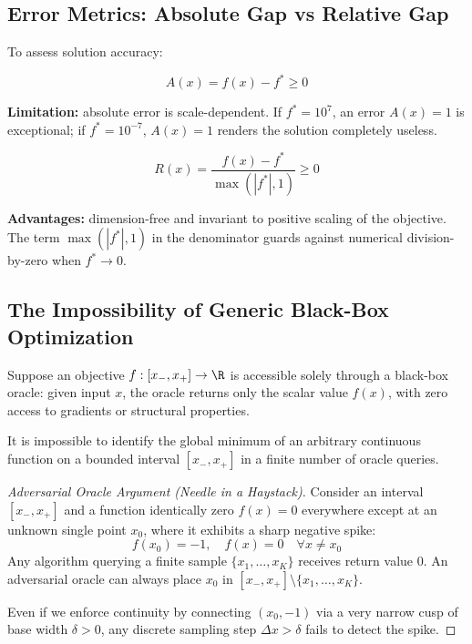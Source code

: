 \subsection{Error Metrics: Absolute Gap vs Relative Gap}
To assess solution accuracy:
\begin{definition}
\begin{equation}
A(x) = f(x) - f^* \ge 0
\end{equation}
\end{definition}
\textbf{Limitation:} absolute error is scale-dependent. If $f^* = 10^7$, an error $A(x) = 1$ is exceptional; if $f^* = 10^{-7}$, $A(x) = 1$ renders the solution completely useless.

\begin{definition}
\begin{equation}
R(x) = \frac{f(x) - f^*}{\max(|f^*|, 1)} \ge 0
\end{equation}
\end{definition}
\textbf{Advantages:} dimension-free and invariant to positive scaling of the objective. The term $\max(|f^*|, 1)$ in the denominator guards against numerical division-by-zero when $f^* \to 0$.

\subsection{The Impossibility of Generic Black-Box Optimization}
Suppose an objective $f: [x_-, x_+] \to \R$ is accessible solely through a black-box oracle: given input $x$, the oracle returns only the scalar value $f(x)$, with zero access to gradients or structural properties.

\begin{theorem}
It is impossible to identify the global minimum of an arbitrary continuous function on a bounded interval $[x_-, x_+]$ in a finite number of oracle queries.
\end{theorem}

\begin{proof}[Adversarial Oracle Argument (\textit{Needle in a Haystack})]
Consider an interval $[x_-, x_+]$ and a function identically zero $f(x) = 0$ everywhere except at an unknown single point $x_0$, where it exhibits a sharp negative spike:
\begin{equation}
f(x_0) = -1, \quad f(x) = 0 \quad \forall x \neq x_0
\end{equation}
Any algorithm querying a finite sample $\{x_1, \dots, x_K\}$ receives return value $0$. An adversarial oracle can always place $x_0$ in $[x_-, x_+] \setminus \{x_1, \dots, x_K\}$.

Even if we enforce continuity by connecting $(x_0, -1)$ via a very narrow cusp of base width $\delta > 0$, any discrete sampling step $\Delta x > \delta$ fails to detect the spike.
\end{proof}

